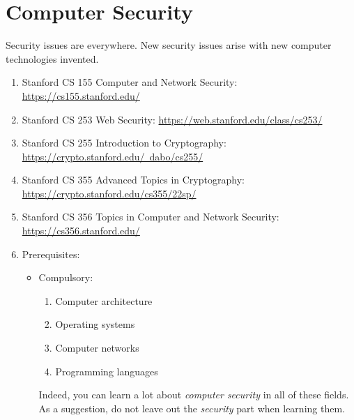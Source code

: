 \documentclass{article}
\begin{document}
\section{Computer Security}
Security issues are everywhere.
New security issues arise with new computer technologies invented.
\begin{enumerate}
    \item Stanford CS 155 Computer and Network Security:
    \href{https://cs155.stanford.edu/}{https://cs155.stanford.edu/}
    \item Stanford CS 253 Web Security:
    \href{https://web.stanford.edu/class/cs253/}{https://web.stanford.edu/class/cs253/}
    \item Stanford CS 255 Introduction to Cryptography:
    \href{https://crypto.stanford.edu/~dabo/cs255/}{https://crypto.stanford.edu/~dabo/cs255/}
    \item Stanford CS 355 Advanced Topics in Cryptography:\\
    \href{https://crypto.stanford.edu/cs355/22sp/}{https://crypto.stanford.edu/cs355/22sp/}
    \item Stanford CS 356 Topics in Computer and Network Security:
    \href{https://cs356.stanford.edu/}{https://cs356.stanford.edu/}
    \item Prerequisites:
    \begin{itemize}
        \item Compulsory:
        \begin{enumerate}
            \item Computer architecture
            \item Operating systems
            \item Computer networks
            \item Programming languages
        \end{enumerate}
        Indeed, you can learn a lot about \emph{computer security} in all of these fields.
        As a suggestion, do not leave out the \emph{security} part when learning them.
    \end{itemize}
\end{enumerate}
\end{document}
